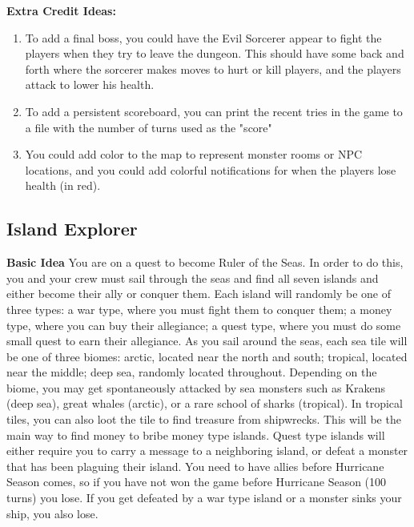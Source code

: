 \textbf{Extra Credit Ideas:}
\begin{enumerate}
    \item To add a final boss, you could have the Evil Sorcerer appear to fight the players when they try to leave the dungeon. This should have some back and forth where the sorcerer makes moves to hurt or kill players, and the players attack to lower his health.
    \item To add a persistent scoreboard, you can print the recent tries in the game to a file with the number of turns used as the "score"
    \item You could add color to the map to represent monster rooms or NPC locations, and you could add colorful notifications for when the players lose health (in red).
\end{enumerate}

\subsection{Island Explorer}
\textbf{Basic Idea} You are on a quest to become Ruler of the Seas. In order to do this, you and your crew must sail through the seas and find all seven islands and either become their ally or conquer them. Each island will randomly be one of three types: a war type, where you must fight them to conquer them; a money type, where you can buy their allegiance; a quest type, where you must do some small quest to earn their allegiance. As you sail around the seas, each sea tile will be one of three biomes: arctic, located near the north and south; tropical, located near the middle; deep sea, randomly located throughout. Depending on the biome, you may get spontaneously attacked by sea monsters such as Krakens (deep sea), great whales (arctic), or a rare school of sharks (tropical). In tropical tiles, you can also loot the tile to find treasure from shipwrecks. This will be the main way to find money to bribe money type islands. Quest type islands will either require you to carry a message to a neighboring island, or defeat a monster that has been plaguing their island. You need to have allies before Hurricane Season comes, so if you have not won the game before Hurricane Season (100 turns) you lose. If you get defeated by a war type island or a monster sinks your ship, you also lose. 


